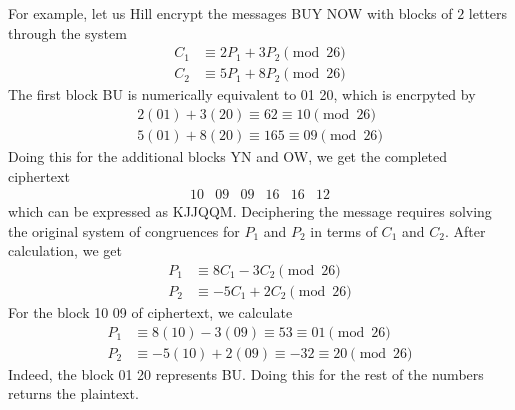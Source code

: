 \documentclass{article}
\theoremstyle{remark}
\theoremstyle{definition}
\begin{document}
For example, let us Hill encrypt the messages BUY NOW with blocks of $2$ letters through the system
\begin{align*}
    C_1 & \equiv 2 P_1 + 3 P_2 \pmod{26} \\
    C_2 & \equiv 5 P_1 + 8 P_2 \pmod{26} 
\end{align*}
The first block BU is numerically equivalent to 01 20, which is encrpyted by 
\begin{align*}
    2 (01) + 3(20) \equiv 62 \equiv 10 \pmod{26} \\
    5(01) + 8(20) \equiv 165 \equiv 09 \pmod{26}
\end{align*}
Doing this for the additional blocks YN and OW, we get the completed ciphertext
\[\begin{array}{cccccc}
    10&09&09&16&16&12
\end{array}\]
which can be expressed as KJJQQM. Deciphering the message requires solving the original system of congruences for $P_1$ and $P_2$ in terms of $C_1$ and $C_2$. After calculation, we get
\begin{align*}
    P_1 & \equiv 8 C_1 - 3 C_2 \pmod{26} \\
    P_2 & \equiv -5 C_1 + 2 C_2 \pmod{26} 
\end{align*}
For the block 10 09 of ciphertext, we calculate
\begin{align*}
    P_1 & \equiv 8 (10) - 3(09) \equiv 53 \equiv 01 \pmod{26} \\
    P_2 & \equiv -5 (10) + 2 (09) \equiv -32 \equiv 20 \pmod{26}
\end{align*}
Indeed, the block 01 20 represents BU. Doing this for the rest of the numbers returns the plaintext. 
\end{document}
